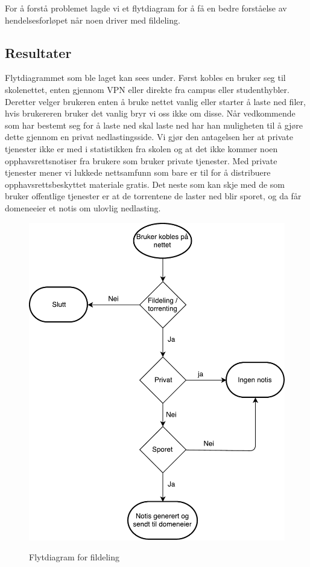 For å forstå problemet lagde vi et flytdiagram for å få en bedre forståelse av hendelsesforløpet når noen driver med fildeling.

\subsection{Resultater}
Flytdiagrammet som ble laget kan sees under. Først kobles en bruker seg til skolenettet, enten gjennom VPN eller direkte fra campus eller studenthybler. Deretter velger brukeren enten å bruke nettet vanlig eller starter å laste ned filer, hvis brukereren bruker det vanlig bryr vi oss ikke om disse. Når vedkommende som har bestemt seg for å laste ned skal laste ned har han muligheten til å gjøre dette gjennom en privat nedlastingsside. Vi gjør den antagelsen her at private tjenester ikke er med i statistikken fra skolen og at det ikke kommer noen opphavsrettsnotiser fra brukere som bruker private tjenester. Med private tjenester mener vi lukkede nettsamfunn som bare er til for å distribuere opphavsrettsbeskyttet materiale gratis. Det neste som kan skje med de som bruker offentlige tjenester er at de torrentene de laster ned blir sporet, og da får domeneeier et notis om ulovlig nedlasting.
\begin{figure}[H]
    \centering
    \includegraphics[scale=0.5]{case_1/bilder/Flowchart.pdf}
    \label{fig:Flytdiagram}
    \caption[Flytdiagram for fildeling]{Flytdiagram for fildeling}
\end{figure}

